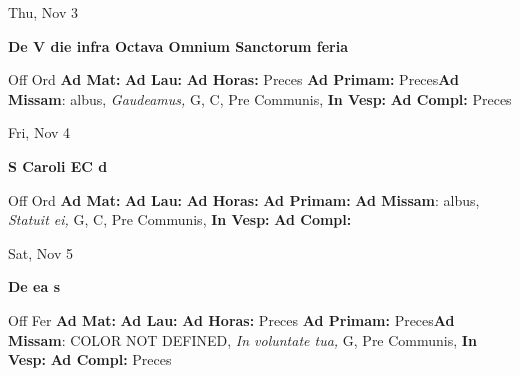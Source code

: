 \documentclass[10pt]{book}
\begin{document}
\begin{center}
\begin{minipage}{3.5in}
\vspace{2em}
\begin{center}Thu, Nov 3
\end{center}
\textbf{ \large De V die infra Octava Omnium Sanctorum
\textnormal{\normalsize feria}}

\begin{justify}Off Ord
\textbf{Ad Mat: }
\textbf{Ad Lau: }
\textbf{Ad Horas: }Preces
\textbf{Ad Primam: }Preces\textbf{Ad Missam}: albus, \textit{Gaudeamus,} G, C, Pre Communis, 
\textbf{In Vesp: }
\textbf{Ad Compl: }Preces
\end{justify}
\end{minipage}
\end{center}

\begin{center}
\begin{minipage}{3.5in}
\vspace{2em}
\begin{center}Fri, Nov 4
\end{center}
\textbf{ \large S Caroli EC
\textnormal{\normalsize d}}

\begin{justify}Off Ord
\textbf{Ad Mat: }
\textbf{Ad Lau: }
\textbf{Ad Horas: }
\textbf{Ad Primam: }\textbf{Ad Missam}: albus, \textit{Statuit ei,} G, C, Pre Communis, 
\textbf{In Vesp: }
\textbf{Ad Compl: }
\end{justify}
\end{minipage}
\end{center}

\begin{center}
\begin{minipage}{3.5in}
\vspace{2em}
\begin{center}Sat, Nov 5
\end{center}
\textbf{ \large De ea
\textnormal{\normalsize s}}

\begin{justify}Off Fer
\textbf{Ad Mat: }
\textbf{Ad Lau: }
\textbf{Ad Horas: }Preces
\textbf{Ad Primam: }Preces\textbf{Ad Missam}: COLOR NOT DEFINED, \textit{In voluntate tua,} G, Pre Communis, 
\textbf{In Vesp: }
\textbf{Ad Compl: }Preces
\end{justify}
\end{minipage}
\end{center}
\end{document}
